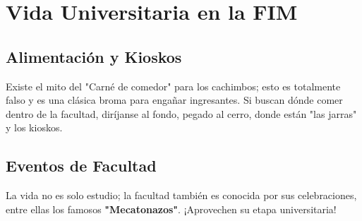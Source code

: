 \section{Vida Universitaria en la FIM}

\subsection{Alimentación y Kioskos}
Existe el mito del "Carné de comedor" para los cachimbos; esto es totalmente falso y es una clásica broma para engañar ingresantes. Si buscan dónde comer dentro de la facultad, diríjanse al fondo, pegado al cerro, donde están "las jarras" y los kioskos.

\subsection{Eventos de Facultad}
La vida no es solo estudio; la facultad también es conocida por sus celebraciones, entre ellas los famosos \textbf{"Mecatonazos"}. ¡Aprovechen su etapa universitaria!
